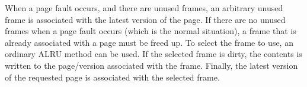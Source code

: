 When a page fault occurs, and there are unused frames, an arbitrary
unused frame is associated with the latest version of the page.  If
there are no unused frames when a page fault occurs (which is the
normal situation), a frame that is already associated with a page must
be freed up.  To select the frame to use, an ordinary ALRU method can
be used.  If the selected frame is dirty, the contents is written to
the page/version associated with the frame.  Finally, the latest
version of the requested page is associated with the selected frame.

